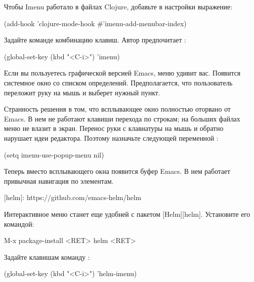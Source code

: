 Чтобы Imenu работало в файлах Clojure, добавьте в настройки выражение:

\begin{english}
  \begin{lisp}
(add-hook 'clojure-mode-hook #'imenu-add-menubar-index)
  \end{lisp}
\end{english}

Задайте команде  комбинацию клавиш. Автор предпочитает :

\begin{english}
  \begin{lisp}
(global-set-key (kbd "<C-i>") 'imenu)
  \end{lisp}
\end{english}

Если вы пользуетесь графической версией Emacs, меню удивит вас. Появится системное окно со списком определений. Предполагается, что пользователь переложит руку на мышь и выберет нужный пункт.

Странность решения в том, что всплывающее окно полностью оторвано от Emacs. В нем не работают клавиши перехода по строкам; на больших файлах меню не влазит в экран. Перенос руки с клавиатуры на мышь и обратно нарушает идеи редактора. Поэтому назначьте следующей переменной :

\begin{english}
  \begin{lisp}
(setq imenu-use-popup-menu nil)
  \end{lisp}
\end{english}

Теперь вместо всплывающего окна появится буфер Emacs. В нем работает привычная навигация по элементам.

[helm]: https://github.com/emacs-helm/helm

Интерактивное меню станет еще удобней с пакетом [Helm][helm]. Установите его командой:

\begin{english}
  \begin{text}
M-x package-install <RET> helm <RET>
  \end{text}
\end{english}

Задайте клавишам  команду :

\begin{english}
  \begin{lisp}
(global-set-key (kbd "<C-i>") 'helm-imenu)
  \end{lisp}
\end{english}

